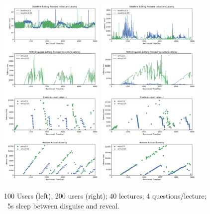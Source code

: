 \begin{figure}[t!]
    \centering
    \includegraphics[width=0.45\textwidth]{figs/concurrent_results_40lec_100users}
    \includegraphics[width=0.45\textwidth]{figs/concurrent_results_40lec_200users}
    \caption{100 Users (left), 200 users (right); 
    40 lectures; 4 questions/lecture; ~5s sleep between disguise and reveal. }
\end{figure}
